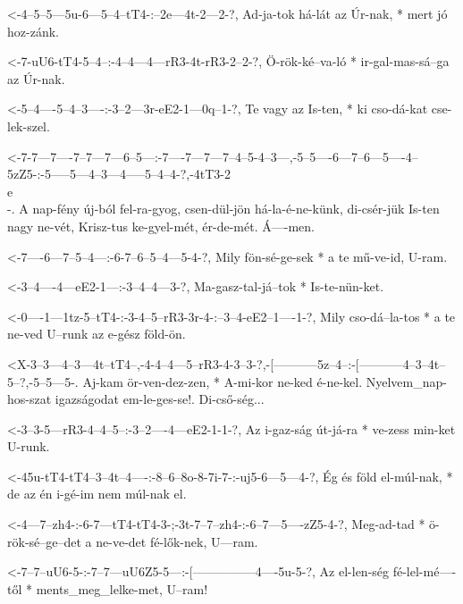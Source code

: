   {<-4--5--5---5u-6---5--4--tT4-:--2e---4t-2---2-?,}
  {  Ad-ja-tok há-lát az Úr-nak, * mert jó hoz-zánk.}

  {<-7-uU6-tT4-5--4--:-4--4---4---rR3-4t-rR3-2--2-?,}
  {  Ö-rök-ké--va-ló * ir-gal-mas-sá--ga az  Úr-nak.}

  {<-5--4----5--4--3----:-3--2---3r-eE2-1---0q--1-?,}
  {  Te vagy az Is-ten, * ki cso-dá-kat cse-lek-szel.}


  {<-7-7---7----7--7---7---6--5---:-7----7---7---7--4--5-4--3---,-5--5----6---7--6---5----4--5zZ5-:-5-----5---4--3---4-----5--4--4-?,-4tT3-2\\e\\-.}
  {  A nap-fény új-ból fel-ra-gyog, csen-dül-jön há-la-é-ne-künk, di-csér-jük Is-ten nagy ne-vét,   Krisz-tus ke-gyel-mét, ér-de-mét. Á----men.}

  {<-7----6---7--5--4---:-6-7--6--5--4---5-4-?,}
  {  Mily fön-sé-ge-sek * a te mű-ve-id, U-ram.}

  {<-3--4----4---eE2-1---:-3--4--4---3-?,}
  {  Ma-gasz-tal-já--tok * Is-te-nün-ket.}

  {<-0----1---1tz-5--tT4-:-3-4--5--rR3-3r-4-:--3--4-eE2--1----1-?,}
  {  Mily cso-dá--la-tos * a te ne-ved U--runk az e-gész föld-ön.}

  {<X-3--3---4--3---4t--tT4--,-4-4--4---5--rR3-4-3--3-?,-[-----------5z--4--:-[-----------4--3--4t--5--?,-5--5---5-.}
  {   Aj-kam ör-ven-dez-zen, * A-mi-kor ne-ked é-ne-kel. Nyelvem_nap-hos-szat igazságodat em-le-ges-se!. Di-cső-ség...}

  {<-3--3-5---rR3-4--4--5--:-3--2----4---eE2-1-1-?,}
  {  Az i-gaz-ság út-já-ra * ve-zess min-ket U-runk.}


  {<-45u-tT4-tT4--3--4t--4----:-8--6--8o-8-7i-7-:-uj5-6---5---4-?,}
  {  Ég  és  föld el-múl-nak, * de az én i-gé-im  nem múl-nak el.}

  {<-4---7--zh4-:-6-7---tT4-tT4-3-;-3t-7--7--zh4-:-6--7---5----zZ5-4-?,}
  {  Meg-ad-tad * ö-rök-sé--ge--det a  ne-ve-det   fé-lők-nek, U---ram.}

  {<-7--7--uU6-5-:-7--7---uU6Z5-5---:-[---------------4----5u-5-?,}
  {  Az el-len-ség fé-lel-mé----től * ments_meg_lelke-met, U--ram!}
